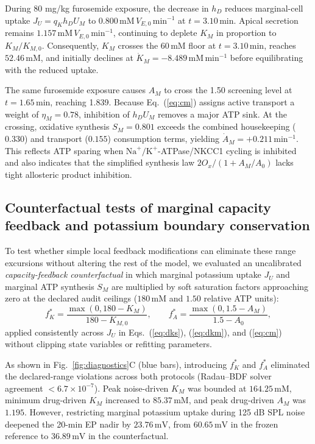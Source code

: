 \documentclass[final,5p,times]{elsarticle}
\begin{document}
During 80 mg/kg furosemide exposure, the decrease in \(h_D\) reduces marginal-cell uptake \(J_U=q_Kh_DU_M\) to \(0.800\,\mathrm{mM}\,V_{E,0}\,\mathrm{min}^{-1}\) at \(t=3.10\,\mathrm{min}\). Apical secretion remains \(1.157\,\mathrm{mM}\,V_{E,0}\,\mathrm{min}^{-1}\), continuing to deplete \(K_M\) in proportion to \(K_M/K_{M,0}\). Consequently, \(K_M\) crosses the \(60\,\mathrm{mM}\) floor at \(t=3.10\,\mathrm{min}\), reaches \(52.46\,\mathrm{mM}\), and initially declines at \(\dot{K}_M=-8.489\,\mathrm{mM}\,\mathrm{min}^{-1}\) before equilibrating with the reduced uptake.

The same furosemide exposure causes \(A_M\) to cross the 1.50 screening level at \(t=1.65\,\mathrm{min}\), reaching 1.839. Because Eq.~(\ref{eq:cm}) assigns active transport a weight of \(\eta_M=0.78\), inhibition of \(h_DU_M\) removes a major ATP sink. At the crossing, oxidative synthesis \(S_M=0.801\) exceeds the combined housekeeping (\(0.330\)) and transport (\(0.155\)) consumption terms, yielding \(\dot{A}_M=+0.211\,\mathrm{min}^{-1}\). This reflects ATP sparing when \(\mathrm{Na}^+/\mathrm{K}^+\)-ATPase/NKCC1 cycling is inhibited and also indicates that the simplified synthesis law \(2O_x/(1 + A_M/A_0)\) lacks tight allosteric product inhibition.

\subsection{Counterfactual tests of marginal capacity feedback and potassium boundary conservation}\label{sec:stability-counterfactuals}

To test whether simple local feedback modifications can eliminate these range excursions without altering the rest of the model, we evaluated an uncalibrated \emph{capacity-feedback counterfactual} in which marginal potassium uptake \(J_U\) and marginal ATP synthesis \(S_M\) are multiplied by soft saturation factors approaching zero at the declared audit ceilings (\(180\,\mathrm{mM}\) and \(1.50\) relative ATP units):
\begin{equation}
  f_K^* = \frac{\max(0, 180 - K_M)}{180 - K_{M,0}}, \qquad
  f_A^* = \frac{\max(0, 1.5 - A_M)}{1.5 - A_0},
  \label{eq:capacity-feedback}
\end{equation}
applied consistently across \(J_U\) in Eqs.~(\ref{eq:dks}), (\ref{eq:dkm}), and (\ref{eq:cm}) without clipping state variables or refitting parameters.

As shown in Fig.~\ref{fig:diagnostics}C (blue bars), introducing \(f_K^*\) and \(f_A^*\) eliminated the declared-range violations across both protocols (Radau--BDF solver agreement \(<6.7\times10^{-7}\)). Peak noise-driven \(K_M\) was bounded at \(164.25\,\mathrm{mM}\), minimum drug-driven \(K_M\) increased to \(85.37\,\mathrm{mM}\), and peak drug-driven \(A_M\) was \(1.195\). However, restricting marginal potassium uptake during 125 dB SPL noise deepened the 20-min EP nadir by \(23.76\,\mathrm{mV}\), from \(60.65\,\mathrm{mV}\) in the frozen reference to \(36.89\,\mathrm{mV}\) in the counterfactual.
\end{document}
